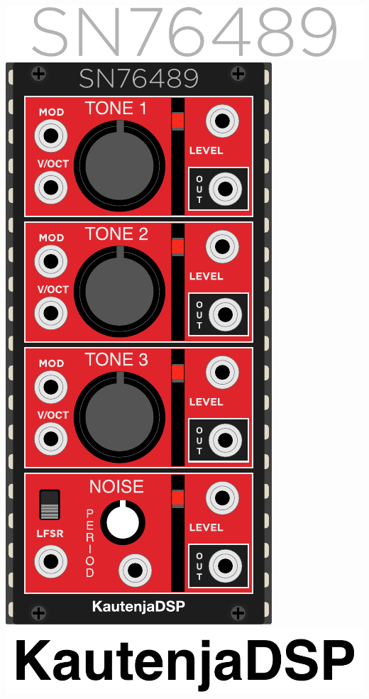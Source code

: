 \documentclass[12pt,a4paper]{article}
\begin{document}

\thispagestyle{empty}
\vspace*{\fill}
\begin{center}
\includegraphics{SN76489-Logo}
\linebreak\linebreak\linebreak\linebreak
\includegraphics{SN76489-Module}
\linebreak\linebreak\linebreak\linebreak
\includegraphics{KautenjaDSP}
\end{center}
\vspace*{\fill}
\clearpage
\end{document}
